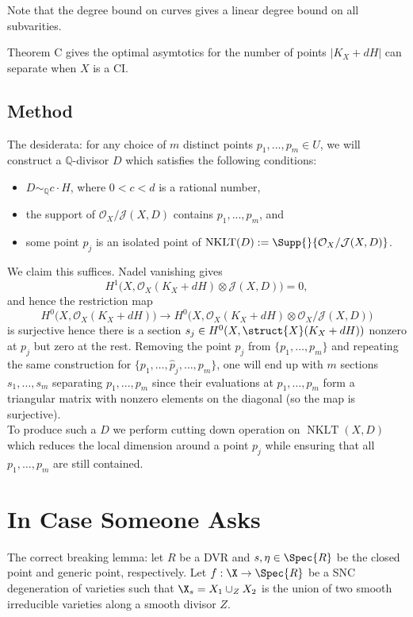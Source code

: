\documentclass[12pt]{article}
\theoremstyle{plain}
\DeclareMathOperator{\NKLT}{NKLT}
\newcommand{\mb}[1]{\mathbb{#1}}
\newcommand{\mtc}[1]{\mathcal{#1}}
\begin{document}
Note that the degree bound on curves gives a linear degree bound on all subvarities. 

\begin{rmk}
Theorem C gives the optimal asymtotics for the number of points $|K_X + d H|$ can separate when $X$ is a CI.
\end{rmk}

\subsection{Method}

The desiderata: for any choice of $m$ distinct points $p_1,...,p_m \in U$, we will construct a $\mb{Q}$-divisor $D$ which satisfies the following conditions:
    \begin{itemize}
        \item $D \sim_{\mb{Q}} c \cdot H$, where $0 < c < d$ is a rational number,
        \item the support of $\mtc{O}_X/\mtc{J}(X,D)$ contains $p_1,...,p_m$, and
        \item some point $p_{j}$ is an isolated point of $\NKLT(D) := \Supp{}{\mtc{O}_X/\mtc{J}(X,D)}$.
    \end{itemize}
We claim this suffices. Nadel vanishing gives
    \[ H^1\big(X,\mtc{O}_X(K_X + d H)\otimes \mtc{J}(X, D)\big) = 0, \]
    and hence the restriction map
    \[ H^0\big(X,\mtc{O}_X(K_X + d H)\big) \longrightarrow H^0\big(X, \mtc{O}_X(K_X + d H)\otimes \mtc{O}_X/\mtc{J}(X,D) \big) \]
    is surjective hence there is a section $s_j \in H^0(X, \struct{X}(K_X + d H))$ nonzero at $p_j$ but zero at the rest. Removing the point $p_{j}$ from $\{p_1, \ldots, p_m\}$ and repeating the same construction for $\{p_1, \ldots, \hat{p}_{j}, \ldots, p_m \}$, one will end up with $m$ sections $s_1, \dots, s_m$ separating $p_1,...,p_m$ since their evaluations at $p_1, \dots, p_m$ form a triangular matrix with nonzero elements on the diagonal (so the map is surjective). 
\bigskip\\
To produce such a $D$ we perform cutting down operation on $\NKLT(X, D)$ which reduces the local dimension around a point $p_j$ while ensuring that all $p_1, \dots, p_m$ are still contained. 

\section{In Case Someone Asks}

The correct breaking lemma: let $R$ be a DVR and $s,\eta \in \Spec{R}$ be the closed point and generic point, respectively. Let $f : \X \to \Spec{R}$ be a SNC degeneration of varieties such that $\X_s = X_1 \cup_Z X_2$ is the union of two smooth irreducible varieties along a smooth divisor $Z$. 
\end{document}
